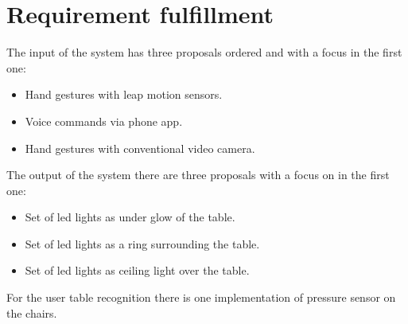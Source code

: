 \documentclass{article}
\begin{document}
\section{Requirement fulfillment}
The input of the system has three proposals ordered and with a focus in the first one:
\begin{itemize}
    \item Hand gestures with leap motion sensors.
    \item Voice commands via phone app.
    \item Hand gestures with conventional video camera.
\end{itemize}
The output of the system there are three proposals with a focus on in the first one:
\begin{itemize}
    \item Set of led lights as under glow of the table.
    \item Set of led lights as a ring surrounding the table.
    \item Set of led lights as ceiling light over the table.
\end{itemize}
For the user table recognition there is one implementation of pressure sensor on the chairs.


\end{document}
